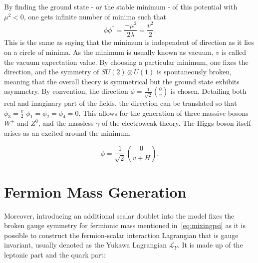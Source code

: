 By finding the ground state - or the stable minimum - of this potential with $\mu^{2}<0$, one gets \DIFaddbegin {}\DIFaddend infinite number of \DIFdelbegin {}\DIFdelend \DIFaddbegin {}\DIFaddend minima such that
\begin{equation}
	\phi\phi^{\dagger}=\frac{-\mu^{2}}{2\lambda}=\frac{v^{2}}{2}.
\end{equation}
This is the same as saying that the minimum is independent of direction as it lies on a circle of minima. As the minimum is usually known as vacuum, $v$ is called the vacuum expectation value. By choosing a particular minimum, one fixes the direction, and the symmetry of $SU(2)\otimes U(1)$ is spontaneously broken, meaning that the overall theory is symmetrical but the ground state exhibits asymmetry. By convention, the direction $\phi=\frac{1}{\sqrt{2}}\binom{0}{v}$ is chosen. Detailing both real and imaginary part of the fields, the direction can be translated so that $\phi_{3}=\frac{v}{2}$ $\phi_{1}=\phi_{2}=\phi_{4}=0$. This allows for the generation of three massive bosons $W^{\pm}$ and $Z^{0}$, and the massless $\gamma$ of the electroweak theory. The Higgs boson itself arises as an excited \DIFdelbegin {}\DIFdelend \DIFaddbegin {}\DIFaddend around the minimum 

\begin{equation}
\phi=\frac{1}{\sqrt{2}}\binom{0}{v+H}.
\label{eq:ref}
\end{equation}


\section{Fermion Mass Generation}
\label{mass}
Moreover, introducing an additional scalar doublet into the model fixes the broken gauge symmetry for fermionic mass mentioned in~\autoref{eq:mixingpsi} as it is possible to construct the fermion-scalar interaction Lagrangian that is gauge invariant, usually denoted as the Yukawa Lagrangian $\mathcal{L}_{Y}$. It is made up of the leptonic part and the quark part:

